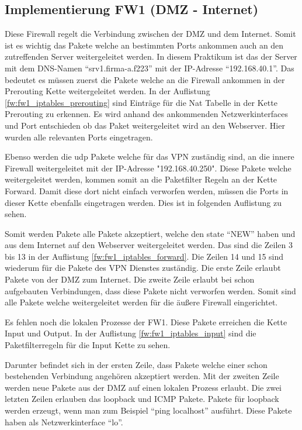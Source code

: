 \subsection{Implementierung FW1 (DMZ - Internet)}
Diese Firewall regelt die Verbindung zwischen der DMZ und dem Internet. Somit ist es wichtig das Pakete welche an bestimmten Ports ankommen auch an den zutreffenden Server weitergeleitet werden. In diesem Praktikum ist das der Server mit dem DNS-Namen "`srv1.firma-a.f223"' mit der IP-Adresse "`192.168.40.1"'. Das bedeutet es müssen zuerst die Pakete welche an die Firewall ankommen in der Prerouting Kette weitergeleitet werden. In der Auflistung \ref{fw:fw1_iptables_prerouting} sind Einträge für die Nat Tabelle in der Kette Prerouting zu erkennen. Es wird anhand des ankommenden Netzwerkinterfaces und Port entschieden ob das Paket weitergeleitet wird an den Webserver. Hier wurden alle relevanten Ports eingetragen.

Ebenso werden die udp Pakete welche für das VPN zuständig sind, an die innere Firewall weitergeleitet mit der IP-Adresse "192.168.40.250". Diese Pakete welche weitergeleitet werden, kommen somit an die Paketfilter Regeln an der Kette Forward. Damit diese dort nicht einfach verworfen werden, müssen die Ports in dieser Kette ebenfalls eingetragen werden. Dies ist in folgenden Auflistung zu sehen.

Somit werden Pakete alle Pakete akzeptiert, welche den state "`NEW"' haben und aus dem Internet auf den Webserver weitergeleitet werden. Das sind die Zeilen 3 bis 13 in der Auflistung \ref{fw:fw1_iptables_forward}. Die Zeilen 14 und 15 sind wiederum für die Pakete des VPN Dienstes zuständig. Die erste Zeile erlaubt Pakete von der DMZ zum Internet. Die zweite Zeile erlaubt bei schon aufgebauten Verbindungen, dass diese Pakete nicht verworfen werden. Somit sind alle Pakete welche weitergeleitet werden für die äußere Firewall eingerichtet. 

Es fehlen noch die lokalen Prozesse der FW1. Diese Pakete erreichen die Kette Input und Output. In der Auflistung \ref{fw:fw1_iptables_input} sind die Paketfilterregeln für die Input Kette zu sehen.

Darunter befindet sich in der ersten Zeile, dass Pakete welche einer schon bestehenden Verbindung angehören akzeptiert werden. Mit der zweiten Zeile werden neue Pakete aus der DMZ auf einen lokalen Prozess erlaubt. Die zwei letzten Zeilen erlauben das loopback und ICMP Pakete. Pakete für loopback werden erzeugt, wenn man zum Beispiel "`ping localhost"' ausführt. Diese Pakete haben als Netzwerkinterface "`lo"'. 

